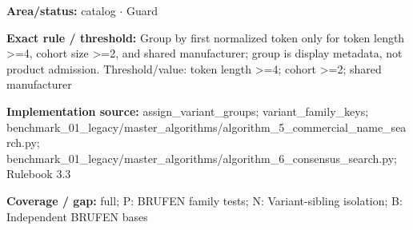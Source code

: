 \begin{tcolorbox}[enhanced,breakable,colback=white,colframe=Muted!45,boxrule=0.45pt,arc=1.5pt,left=6pt,right=6pt,top=5pt,bottom=5pt,title={\texttt{CAT-VARIANT-GROUP-02}},title after break={\texttt{CAT-VARIANT-GROUP-02}\ (continued)},fonttitle=\headingfont\bfseries\color{Navy},coltitle=Navy]
\textbf{Area/status:} catalog $\boldsymbol{\cdot}$ Guard\par
\smallskip
\textbf{Exact rule / threshold:} Group by first normalized token only for token length >=4, cohort size >=2, and shared manufacturer; group is display metadata, not product admission. Threshold/\allowbreak{}value: token length >=4; cohort >=2; shared manufacturer\par
\smallskip
\textbf{Implementation source:} assign\_\allowbreak{}variant\_\allowbreak{}groups; variant\_\allowbreak{}family\_\allowbreak{}keys; benchmark\_\allowbreak{}01\_\allowbreak{}legacy/\allowbreak{}master\_\allowbreak{}algorithms/\allowbreak{}algorithm\_\allowbreak{}5\_\allowbreak{}commercial\_\allowbreak{}name\_\allowbreak{}search.py; benchmark\_\allowbreak{}01\_\allowbreak{}legacy/\allowbreak{}master\_\allowbreak{}algorithms/\allowbreak{}algorithm\_\allowbreak{}6\_\allowbreak{}consensus\_\allowbreak{}search.py; Rulebook 3.3\par
\smallskip
\textbf{Coverage / gap:} full; P: BRUFEN family tests; N: Variant-sibling isolation; B: Independent BRUFEN bases
\end{tcolorbox}
\medskip

